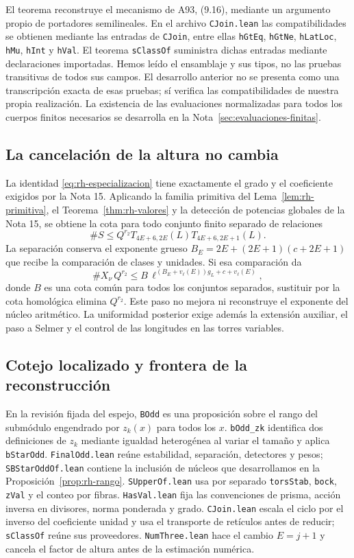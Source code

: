 El teorema reconstruye el mecanismo de A93, (9.16), mediante un argumento propio de portadores semilineales. En el archivo \texttt{CJoin.lean} las compatibilidades se obtienen mediante las entradas de \texttt{CJoin}, entre ellas \texttt{hGtEq}, \texttt{hGtNe}, \texttt{hLatLoc}, \texttt{hMu}, \texttt{hInt} y \texttt{hVal}. El teorema \texttt{sClassOf} suministra dichas entradas mediante declaraciones importadas. Hemos leído el ensamblaje y sus tipos, no las pruebas transitivas de todos sus campos. El desarrollo anterior no se presenta como una transcripción exacta de esas pruebas; sí verifica las compatibilidades de nuestra propia realización. La existencia de las evaluaciones normalizadas para todos los cuerpos finitos necesarios se desarrolla en la Nota~\ref{sec:evaluaciones-finitas}.

\subsection{La cancelación de la altura no cambia}

La identidad \eqref{eq:rh-especializacion} tiene exactamente el grado y el coeficiente exigidos por la Nota 15. Aplicando la familia primitiva del Lema~\ref{lem:rh-primitiva}, el Teorema~\ref{thm:rh-valores} y la detección de potencias globales de la Nota 15, se obtiene la cota para todo conjunto finito separado de relaciones
\[
 \#S\le Q^{r_2}T_{4E+6,2E}(L)T_{4E+6,2E+1}(L).
\]
La separación conserva el exponente grueso $B_E=2E+(2E+1)(c+2E+1)$ que recibe la comparación de clases y unidades. Si esa comparación da
\[
 \#X_\nu\,Q^{r_2}\le
 B\,\ell^{(B_E+v_\ell(E))g_L+c+v_\ell(E)},
\]
 donde $B$ es una cota común para todos los conjuntos separados, sustituir por la cota homológica elimina $Q^{r_2}$. Este paso no mejora ni reconstruye el exponente del núcleo aritmético. La uniformidad posterior exige además la extensión auxiliar, el paso a Selmer y el control de las longitudes en las torres variables.

\subsection{Cotejo localizado y frontera de la reconstrucción}

En la revisión fijada del espejo, \texttt{BOdd} es una proposición sobre el rango del submódulo engendrado por $z_k(x)$ para todos los $x$. \texttt{bOdd\_zk} identifica dos definiciones de $z_k$ mediante igualdad heterogénea al variar el tamaño y aplica \texttt{bStarOdd}. \texttt{FinalOdd.lean} reúne estabilidad, separación, detectores y pesos; \texttt{SBStarOddOf.lean} contiene la inclusión de núcleos que desarrollamos en la Proposición~\ref{prop:rh-rango}. \texttt{SUpperOf.lean} usa por separado \texttt{torsStab}, \texttt{bock}, \texttt{zVal} y el conteo por fibras. \texttt{HasVal.lean} fija las convenciones de prisma, acción inversa en divisores, norma ponderada y grado. \texttt{CJoin.lean} escala el ciclo por el inverso del coeficiente unidad y usa el transporte de retículos antes de reducir; \texttt{sClassOf} reúne sus proveedores. \texttt{NumThree.lean} hace el cambio $E=j+1$ y cancela el factor de altura antes de la estimación numérica.


